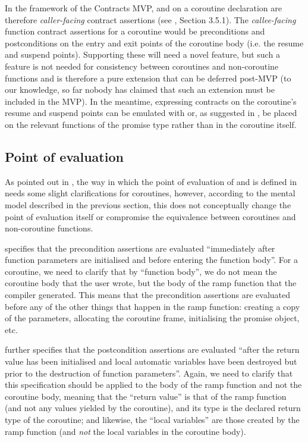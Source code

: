 In the framework of the Contracts MVP,  and  on a coroutine declaration are therefore \emph{caller-facing} contract assertions (see \cite{P2900R8}, Section 3.5.1). The \emph{callee-facing} function contract assertions for a coroutine would be preconditions and postconditions on the entry and exit points of the coroutine body (i.e. the resume and suspend points). Supporting these will need a novel feature, but such a feature is not needed for consistency between coroutines and non-coroutine functions and is therefore a pure extension that can be deferred post-MVP (to our knowledge, so far nobody has claimed that such an extension must be included in the MVP). In the meantime, expressing contracts on the coroutine's resume and suspend points can be emulated with  or, as suggested in \cite{P3251R0}, be placed on the relevant functions of the promise type rather than in the coroutine itself.

\subsection{Point of evaluation}

As pointed out in \cite{P2957R1}, the way in which the point of evaluation of  and  is defined in \cite{P2900R8} needs some slight clarifications for coroutines, however, according to the mental model described in the previous section, this does not conceptually change the point of evaluation itself or compromise the equivalence between coroutines and non-coroutine functions.

\cite{P2900R8} specifies that the precondition assertions are evaluated ``immediately after function parameters are initialised and before entering the function body''. For a coroutine, we need to clarify that by ``function body'', we do not mean the coroutine body that the user wrote, but the body of the ramp function that the compiler generated. This means that the precondition assertions are evaluated before any of the other things that happen in the ramp function: creating a copy of the parameters, allocating the coroutine frame, initialising the promise object, etc.

\cite{P2900R8} further specifies that the postcondition assertions are evaluated ``after the return value has been initialised and local automatic variables have been destroyed but prior to the destruction of function parameters''. Again, we need to clarify that this specification should be applied to the body of the ramp function and not the coroutine body, meaning that the ``return value'' is that of the ramp function (and not any values yielded by the coroutine), and its type is the declared return type of the coroutine; and likewise, the ``local variables'' are those created by the ramp function (and \emph{not} the local variables in the coroutine body).

